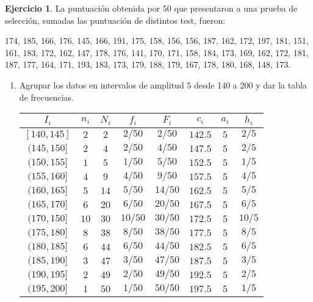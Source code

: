 \documentclass[a4paper, 12pt]{article}
\theoremstyle{definition}
\newtheorem{ej}{Ejercicio}
\begin{document}
\begin{ej} 
La puntuación obtenida por 50 que presentaron a una prueba de selección, sumadas las puntuación de distintos test, fueron:

\begin{center}
174, 185, 166, 176, 145, 166, 191, 175, 158, 156, 156, 187, 162, 172, 197, 181, 151, 161, 183, 172, 162, 147, 178, 176, 141, 170, 171, 158, 184, 173, 169, 162, 172, 181, 187, 177, 164, 171, 193, 183, 173, 179, 188, 179, 167, 178, 180, 168, 148, 173.
\end{center}

\begin{enumerate}[label=\textit{\alph*)}]

\item Agrupar los datos en intervalos de amplitud 5 desde 140 a 200 y dar la tabla de frecuencias.

\begin{center}
    
\begin{tabular}{|c|c|c|c|c|c|c|c|}
    \hline
    \(I_i\) & \(n_i\) & \(N_i\) & \(f_i\) & \(F_i\) & \(c_i\) & \(a_i\) & \(h_i\) \\ 
    \hline
    \([140,145]\) & \(2\) & \(2\) & \(2/50\) & \(2/50\) & \(142.5\) & \(5\) & \(2/5\) \\
    \((145,150]\) & \(2\) & \(4\) & \(2/50\) & \(4/50\) & \(147.5\) & \(5\) & \(2/5\) \\
    \((150, 155]\) & \(1\) & \(5\) & \(1/50\) & \(5/50\) & \(152.5\) & \(5\) & \(1/5\) \\
    \((155,160]\) & \(4\) & \(9\) & \(4/50\) & \(9/50\) & \(157.5\) & \(5\) & \(4/5\) \\
    \((160,165]\) & \(5\) & \(14\) & \(5/50\) & \(14/50\) & \(162.5\) & \(5\) & \(5/5\) \\
    \((165,170]\) & \(6\) & \(20\) & \(6/50\) & \(20/50\) & \(167.5\) & \(5\) & \(6/5\) \\
    \((170,150]\) & \(10\) & \(30\) & \(10/50\) & \(30/50\) & \(172.5\) & \(5\) & \(10/5\) \\
    \((175,180]\) & \(8\) & \(38\) & \(8/50\) & \(38/50\) & \(177.5\) & \(5\) & \(8/5\) \\
    \((180,185]\) & \(6\) & \(44\) & \(6/50\) & \(44/50\) & \(182.5\) & \(5\) & \(6/5\) \\
    \((185,190]\) & \(3\) & \(47\) & \(3/50\) & \(47/50\) & \(187.5\) & \(5\) & \(3/5\) \\
    \((190,195]\) & \(2\) & \(49\) & \(2/50\) & \(49/50\) & \(192.5\) & \(5\) & \(2/5\) \\
    \((195,200]\) & \(1\) & \(50\) & \(1/50\) & \(50/50\) & \(197.5\) & \(5\) & \(1/5\) \\
    \hline
\end{tabular}


\end{center}
\end{enumerate}
\end{ej}
\end{document}
